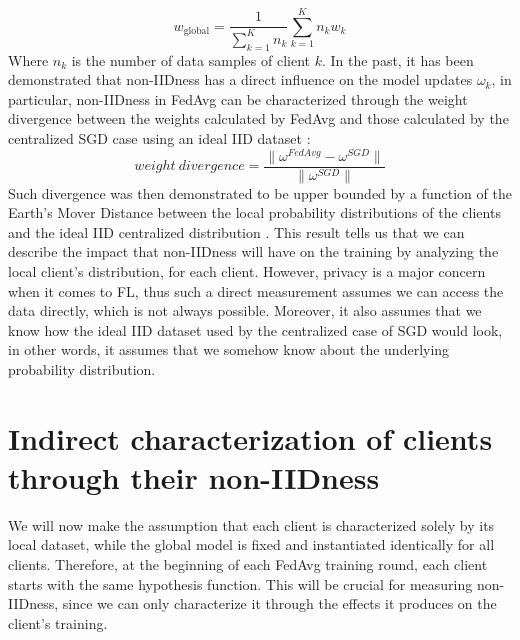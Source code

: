 \documentclass{article}
\begin{document}
\begin{equation*}
w_{\text{global}} = \frac{1}{\sum_{k=1}^K n_k} \sum_{k=1}^K n_k w_k
\end{equation*}
Where $n_k$ is the number of data samples of client $k$. In the past, it has been demonstrated that non-IIDness has a direct influence on the model updates $\omega_k$, in particular, non-IIDness in FedAvg can be characterized through the weight divergence between the weights calculated by FedAvg and those calculated by the centralized SGD case using an ideal IID dataset \cite{FL-DataSharing}:
\begin{equation*}
    weight\ divergence = \frac{\lVert \omega^{FedAvg}-\omega^{SGD} \rVert}{\lVert \omega^{SGD} \rVert} 
\end{equation*}
Such divergence was then demonstrated to be upper bounded by a function of the Earth's Mover Distance between the local probability distributions of the clients and the ideal IID centralized distribution \cite{FL-DataSharing}.
This result tells us that we can describe the impact that non-IIDness will have on the training by analyzing the local client's distribution, for each client. However, privacy is a major concern when it comes to FL, thus such a direct measurement assumes we can access the data directly, which is not always possible. Moreover, it also assumes that we know how the ideal IID dataset used by the centralized case of SGD would look, in other words, it assumes that we somehow know about the underlying probability distribution.

\section{Indirect characterization of clients through their non-IIDness}
We will now make the assumption that each client is characterized solely by its local dataset, while the global model is fixed and instantiated identically for all clients. Therefore, at the beginning of each FedAvg training round, each client starts with the same hypothesis function. This will be crucial for measuring non-IIDness, since we can only characterize it through the effects it produces on the client's training.
\end{document}
